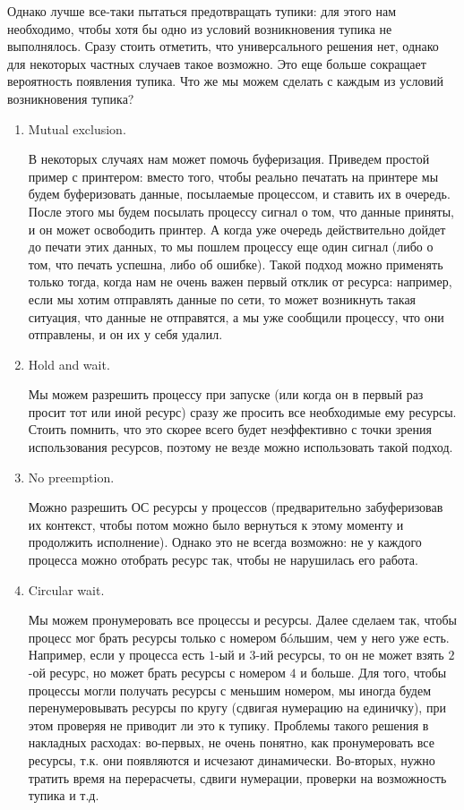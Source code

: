 Однако лучше все-таки пытаться предотвращать тупики: для этого нам необходимо,
чтобы хотя бы одно из условий возникновения тупика не выполнялось. Сразу стоить
отметить, что универсального решения нет, однако для некоторых частных случаев
такое возможно. Это еще больше сокращает вероятность появления тупика. Что же мы
можем сделать с каждым из условий возникновения тупика?

\begin{enumerate}
\item
  Mutual exclusion.

  В некоторых случаях нам может помочь буферизация. Приведем простой пример с
  принтером: вместо того, чтобы реально печатать на принтере мы будем
  буферизовать данные, посылаемые процессом, и ставить их в очередь. После этого
  мы будем посылать процессу сигнал о том, что данные приняты, и он может
  освободить принтер. А когда уже очередь действительно дойдет до печати этих
  данных, то мы пошлем процессу еще один сигнал (либо о том, что печать успешна,
  либо об ошибке). Такой подход можно применять только тогда, когда нам не очень
  важен первый отклик от ресурса: например, если мы хотим отправлять данные по
  сети, то может возникнуть такая ситуация, что данные не отправятся, а мы уже
  сообщили процессу, что они отправлены, и он их у себя удалил.
  
\item
  Hold and wait.

  Мы можем разрешить процессу при запуске (или когда он в первый раз просит тот
  или иной ресурс) сразу же просить все необходимые ему ресурсы. Стоить помнить,
  что это скорее всего будет неэффективно с точки зрения использования ресурсов,
  поэтому не везде можно использовать такой подход. 

\item
  No preemption.

  Можно разрешить ОС  ресурсы у процессов (предварительно
  забуферизовав их контекст, чтобы потом можно было вернуться к этому моменту и
  продолжить исполнение). Однако это не всегда возможно: не у каждого процесса
  можно отобрать ресурс так, чтобы не нарушилась его работа.

\item
  Circular wait.

  Мы можем пронумеровать все процессы и ресурсы. Далее сделаем так, чтобы
  процесс мог брать ресурсы только с номером б\'oльшим, чем у него уже есть.
  Например, если у процесса есть \(1\)-ый и \(3\)-ий ресурсы, то он не может
  взять \(2\)-ой ресурс, но может брать ресурсы с номером \(4\) и больше. Для
  того, чтобы процессы могли получать ресурсы с меньшим номером, мы иногда будем
  перенумеровывать ресурсы по кругу (сдвигая нумерацию на единичку), при этом
  проверяя не приводит ли это к тупику. Проблемы такого решения в накладных
  расходах: во-первых, не очень понятно, как пронумеровать все ресурсы, т.к. они
  появляются и исчезают динамически. Во-вторых, нужно тратить время на
  перерасчеты, сдвиги нумерации, проверки на возможность тупика и т.д.
\end{enumerate}

